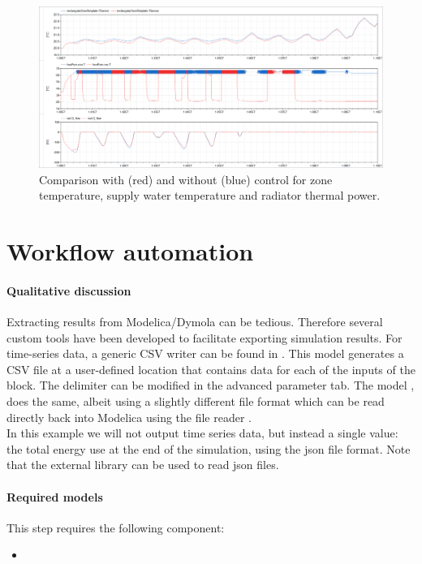 \documentclass[10pt,a4paper]{article}
\begin{document}
\begin{figure}[h]
	\centering
	\includegraphics[width=\linewidth]{Example7.png}
	\caption{Comparison with (red) and without (blue) control for zone temperature, supply water temperature and radiator thermal power.}
	\label{fig:res2}
\end{figure}

\section{Workflow automation}
\paragraph{Qualitative discussion}
Extracting results from Modelica/Dymola can be tedious. 
Therefore several custom tools have been developed to facilitate exporting simulation results.
For time-series data, a generic CSV writer can be found in .
This model generates a CSV file at a user-defined location that contains
data for each of the inputs of the block. 
The delimiter can be modified in the advanced parameter tab.
The model , does the same, albeit using a slightly
different file format which can be read directly back into Modelica using the
file reader .\\

In this example we will not output time series data, but instead a single value: the total
energy use at the end of the simulation, using the json file format. 
Note that the external library  can be used to read json files.


\paragraph{Required models}
This step requires the following component:
\begin{itemize}
\item {}
\end{itemize}
\end{document}
